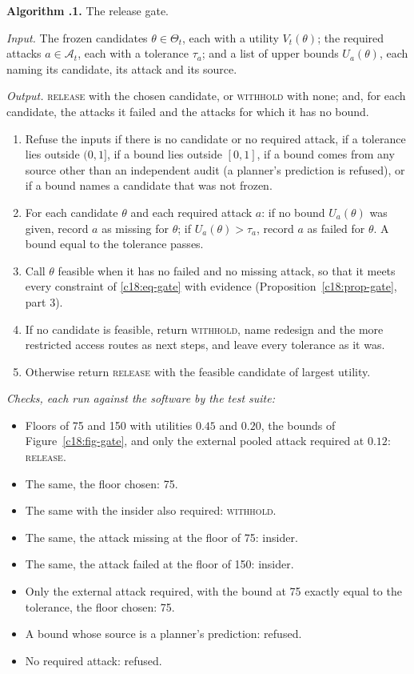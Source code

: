 \begin{mdframed}[linecolor=gray!60,backgroundcolor=gray!5]
\textbf{Algorithm \thechapter.1.} The release gate.\par\smallskip
\textit{Input.} The frozen candidates $\theta\in\Theta_t$, each with a utility $V_t(\theta)$; the required attacks $a\in\mathcal A_t$, each
with a tolerance $\tau_a$; and a list of upper bounds $U_a(\theta)$, each naming its candidate, its attack and
its source.\par
\textit{Output.} \textsc{release} with the chosen candidate, or \textsc{withhold} with none; and, for each candidate, the attacks it failed and the attacks for which it has no bound.
\begin{enumerate}
\item Refuse the inputs if there is no candidate or no required attack, if a tolerance lies outside
$(0,1]$, if a bound lies outside $[0,1]$, if a bound comes from any source other than an independent audit (a planner's prediction is refused), or if a bound names a candidate that was not frozen.
\item For each candidate $\theta$ and each required attack $a$: if no bound $U_a(\theta)$ was given, record $a$ as
missing for $\theta$; if $U_a(\theta)>\tau_a$, record $a$ as failed for $\theta$. A bound equal to the tolerance passes.
\item Call $\theta$ feasible when it has no failed and no missing attack, so that it meets every constraint
of \eqref{c18:eq-gate} with evidence (Proposition~\ref{c18:prop-gate}, part 3).
\item If no candidate is feasible, return \textsc{withhold}, name redesign and the more restricted access routes as next steps, and leave every tolerance as it was.
\item Otherwise return \textsc{release} with the feasible candidate of largest utility.
\end{enumerate}
\textit{Checks, each run against the software by the test suite:}
\begin{itemize}
\item Floors of 75 and 150 with utilities $0.45$ and $0.20$, the bounds of Figure~\ref{c18:fig-gate}, and only the external pooled attack required at $0.12$: \textsc{release}.
\item The same, the floor chosen: 75.
\item The same with the insider also required: \textsc{withhold}.
\item The same, the attack missing at the floor of 75: insider.
\item The same, the attack failed at the floor of 150: insider.
\item Only the external attack required, with the bound at 75 exactly equal to the tolerance, the floor chosen: 75.
\item A bound whose source is a planner's prediction: refused.
\item No required attack: refused.
\end{itemize}
\end{mdframed}

